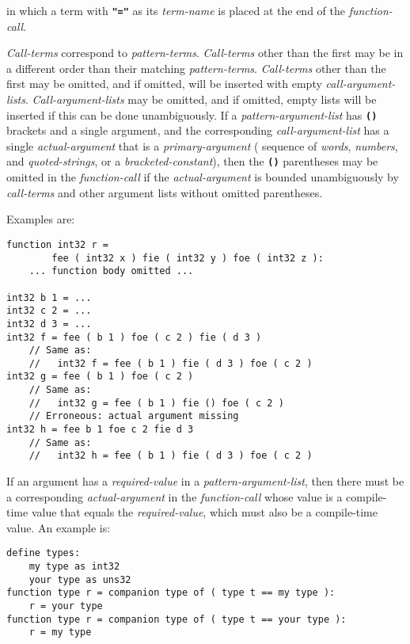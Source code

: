 \documentclass[12pt]{article}
\newcommand{\TT}[1]{{\tt \bfseries #1}}
\newenvironment{indpar}[1][0.3in]%
	{\begin{list}{}%
		     {\setlength{\itemsep}{0in}%
		      \setlength{\topsep}{0in}%
		      \setlength{\parsep}{1ex}%
		      \setlength{\labelwidth}{#1}%
		      \setlength{\leftmargin}{#1}%
		      \addtolength{\leftmargin}{\labelsep}}%
	 \item}%
	{\end{list}}
\begin{document}
in which a term with \TT{"="} as its {\em term-name} is
placed at the end of the {\em function-call}.

{\em Call-terms} correspond to {\em pattern-terms}.  {\em Call-terms}
other than the first may be in a different order than their matching
{\em pattern-terms}.  {\em Call-terms} other than the first may be
omitted, and if omitted, will be inserted with empty {\em call-argument-lists}.
{\em Call-argument-lists} may be omitted, and if omitted, empty
lists will be inserted if this can be done unambiguously.
If a {\em pattern-argument-list} has \TT{()} brackets and a single
argument, and the corresponding {\em call-argument-list} has a single
{\em actual-argument} that
is a {\em primary-argument} ( sequence of {\em words}, {\em numbers},
and {\em quoted-strings}, or a {\em bracketed-constant}), then
the \TT{()} parentheses may be omitted in the {\em function-call}
if the {\em actual-argument} is bounded unambiguously by {\em call-terms}
and other argument lists without omitted parentheses.

Examples are:
\begin{indpar}\begin{verbatim}
function int32 r =
        fee ( int32 x ) fie ( int32 y ) foe ( int32 z ):
    ... function body omitted ...

int32 b 1 = ...
int32 c 2 = ...
int32 d 3 = ...
int32 f = fee ( b 1 ) foe ( c 2 ) fie ( d 3 )
    // Same as:
    //   int32 f = fee ( b 1 ) fie ( d 3 ) foe ( c 2 )
int32 g = fee ( b 1 ) foe ( c 2 )
    // Same as:
    //   int32 g = fee ( b 1 ) fie () foe ( c 2 )
    // Erroneous: actual argument missing
int32 h = fee b 1 foe c 2 fie d 3
    // Same as:
    //   int32 h = fee ( b 1 ) fie ( d 3 ) foe ( c 2 )
\end{verbatim}\end{indpar}

If an argument has a {\em required-value} in a {\em pattern-argument-list},
then there must be a corresponding {\em actual-argument} in the
{\em function-call} whose value is a compile-time value that equals the
{\em required-value}, which must also be a compile-time value.  An example is:
\begin{indpar}\begin{verbatim}
define types:
    my type as int32
    your type as uns32
function type r = companion type of ( type t == my type ):
    r = your type
function type r = companion type of ( type t == your type ):
    r = my type
\end{verbatim}\end{indpar}
\end{document}
